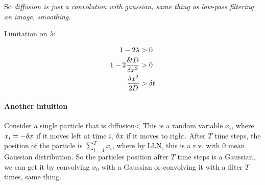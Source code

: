 So \emph{diffusion is just a convolution with gaussian, same thing as
low-pass filtering an image, smoothing}.

Limitation on $\lambda$:  

\begin{align*}
  1 - 2\lambda &> 0\\
1 - 2\frac{\delta t D}{\delta x^2} &> 0\\
\frac{\delta x^2}{2D} &> \delta t 
\end{align*}

\paragraph{Another intuition}
Consider a single particle that is diffusion< This
is a random variable $x_i$, where $x_i = -\delta x$ if it moves left at
time $i$, $\delta x$ if it moves to right. After $T$ time steps, the
position of the particle is $\sum_{i=1}^T x_i$, where by LLN, this is
a r.v. with 0 mean Gaussian distribution. So the particles position
after $T$ time steps is a Gaussian, we can get it by convolving $x_0$
with a Gaussian or convolving it with a filter $T$ times, same thing.


\pagebreak
\pagebreak
\pagebreak

